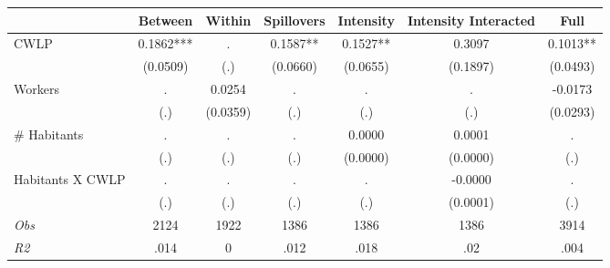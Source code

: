 \begin{tabular}{l*{6}{c}}\hline&\multicolumn{1}{c}{Between}&\multicolumn{1}{c}{Within}&\multicolumn{1}{c}{Spillovers}&\multicolumn{1}{c}{Intensity}&\multicolumn{1}{c}{Intensity Interacted}&\multicolumn{1}{c}{Full}\\ \hline 
CWLP & 0.1862*** & . & 0.1587** & 0.1527** & 0.3097 & 0.1013** \\
 & (0.0509) & (.) & (0.0660) & (0.0655) & (0.1897) & (0.0493) \\
Workers & . & 0.0254 & . & . & . & -0.0173 \\
 & (.) & (0.0359) & (.) & (.) & (.) & (0.0293) \\
\# Habitants & . & . & . & 0.0000 & 0.0001 & . \\
 & (.) & (.) & (.) & (0.0000) & (0.0000) & (.) \\
Habitants X CWLP & . & . & . & . & -0.0000 & . \\
 & (.) & (.) & (.) & (.) & (0.0001) & (.) \\
\hline \textit{Obs} & 2124 & 1922 & 1386 & 1386 & 1386 & 3914 \\ \textit{R2} & .014 & 0 & .012 & .018 & .02 & .004 \\ \hline \end{tabular}
